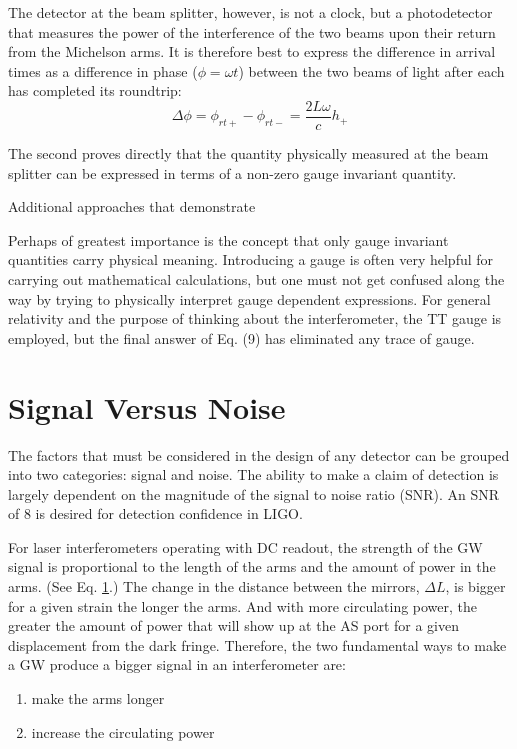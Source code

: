 The detector at the beam splitter, however, is not a clock, but a
photodetector that measures the power of the interference of the two
beams upon their return from the Michelson arms. It is therefore best
to express the difference in arrival times as a difference in phase
($\phi = \omega t$) between the two beams of light after each has
completed its roundtrip:
\begin{equation}
\Delta \phi = \phi_{rt+} - \phi_{rt-} = \frac{2 L \omega}{c} h_+
\end{equation}



The second
proves directly that the quantity physically measured at the beam splitter can be expressed
in terms of a non-zero gauge invariant quantity. 

Additional approaches that demonstrate \cite{Garfinkle2005Gauge} \cite{Saulson1997If} \cite{Faraoni2007Common}


Perhaps of greatest importance is the concept that only gauge invariant quantities carry
physical meaning. Introducing a gauge is often very helpful for carrying out mathematical
calculations, but one must not get confused along the way by trying to physically interpret
gauge dependent expressions. For general relativity and the purpose of thinking about the
interferometer, the TT gauge is employed, but the final answer of Eq. (9) has eliminated
any trace of gauge.






\section{Signal Versus Noise}
The factors that must be considered in the design of any detector can
be grouped into two categories: signal and noise. The ability to make
a claim of detection is largely dependent on the magnitude of the
signal to noise ratio (SNR). An SNR of 8 is desired for detection
confidence in LIGO. 

For laser interferometers operating with DC readout, the strength of
the GW signal is proportional to the length of the arms and the amount
of power in the arms. (See Eq. \ref{}.) The change in the distance
between the mirrors, $\Delta L$, is bigger for a given strain the
longer the arms. And with more circulating power, the greater the
amount of power that will show up at the AS port for a given
displacement from the dark fringe. Therefore, the two fundamental ways
to make a GW produce a bigger signal in an interferometer are:
\begin{enumerate}
\item make the arms longer \vspace{-10 pt}
\item increase the circulating power
\end{enumerate}

